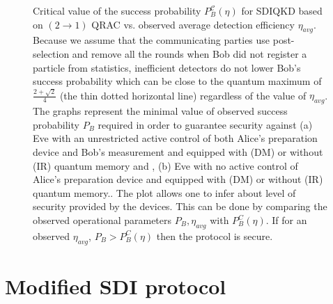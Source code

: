 \documentclass[smallextended]{svjour3}
\begin{document}
\begin{figure}
\centering
{}
\caption{Critical value of the success probability $P_B^{\mathcal{C}}(\eta)$ for SDIQKD based on $(2\to1)$ QRAC vs. observed average detection efficiency $\eta_{avg}$. 
Because we assume that the communicating parties use post-selection and remove all the rounds when Bob did not register a particle from statistics, inefficient detectors do not lower Bob's success probability which can be close to the quantum maximum of $\frac{2+\sqrt{2}}{4}$ (the thin dotted horizontal line) regardless of the value of $\eta_{avg}$. The graphs represent the minimal value of observed success probability $P_B$ required in order to guarantee security against (a) Eve with an unrestricted active control of both Alice's preparation device and Bob's measurement and equipped with (DM) or without (IR) quantum memory and , (b) Eve with no active control of Alice's preparation device and equipped with (DM) or without (IR) quantum memory.. The plot allows one to infer about level of security provided by the devices. This can be done by comparing the observed operational parameters $P_B,\eta_{avg}$ with $P_B^C(\eta)$. If for an observed $\eta_{avg}$, $P_B>P_B^C(\eta)$ then the protocol is secure.
 }
\label{maxpe}
\end{figure}
\section{\label{sec:level1} Modified SDI protocol}
\end{document}
